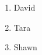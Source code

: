 \documentclass{article}
\begin{document}
	\begin{enumerate}
		\item David 
		\item Tara
		\item Shawn
		\end{enumerate}
\end{document}
